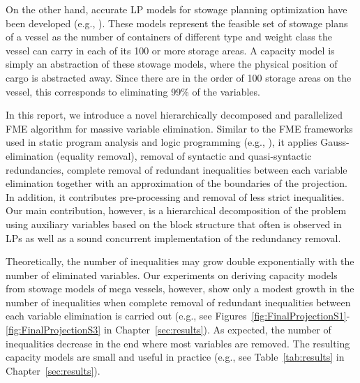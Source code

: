 On the other hand, accurate LP models for stowage planning optimization have been developed (e.g., {\cite{pacino11,pacino12,AlbertosThesis}}). These models represent the feasible set of stowage plans of a vessel as the number of containers of different type and weight class the vessel can carry in each of its 100 or more storage areas. A capacity model is simply an abstraction of these stowage models, where the physical position of cargo is abstracted away. Since there are in the order of 100 storage areas on the vessel, this corresponds to eliminating 99\% of the variables. 

In this report, we introduce a novel hierarchically decomposed and parallelized FME algorithm for massive variable elimination. Similar to the FME frameworks used in static program analysis and logic programming (e.g., \cite{simon05,lukatskii08,shapot12}), it applies Gauss\--eli\-mi\-na\-tion (equality removal), removal of syntactic and quasi-syntactic redundancies, complete removal of redundant inequalities between each variable elimination together with an approximation of the boundaries of the projection. In addition, it contributes pre-processing and removal of less strict inequalities. 
Our main contribution, however, is a hierarchical decomposition of the problem using auxiliary variables based on the block structure that often is observed in LPs \cite{williams} as well as a sound concurrent implementation of the redundancy removal. 

Theoretically, the number of inequalities may grow double exponentially with the number of eliminated variables. Our experiments on deriving capacity models from stowage models of mega vessels, however, show only a modest growth in the number of inequalities  when complete removal of redundant inequalities between each variable elimination is carried out (e.g., see Figures~\ref{fig:FinalProjectionS1}-\ref{fig:FinalProjectionS3} in Chapter~\ref{sec:results}). As expected, the number of inequalities decrease in the end where most variables are removed. The resulting capacity models are small and useful in practice (e.g., see Table~\ref{tab:results} in Chapter~\ref{sec:results}). 


